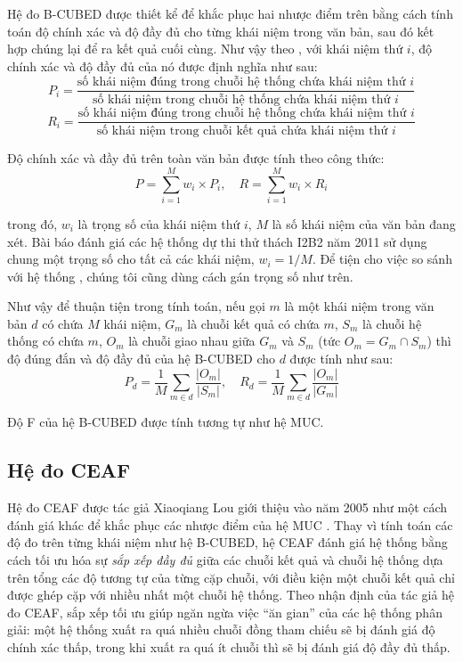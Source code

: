 Hệ đo B-CUBED được thiết kể để khắc phục hai nhược điểm trên bằng cách tính toán độ chính xác và độ đầy đủ cho từng khái niệm trong văn bản, sau đó kết hợp chúng lại để ra kết quả cuối cùng. Như vậy theo \cite{AmitBagga1998}, với khái niệm thứ $i$, độ chính xác và độ đầy đủ của nó được định nghĩa như sau:
\[P_i=\frac{\text{số khái niệm đúng trong chuỗi hệ thống chứa khái niệm thứ $i$}}{\text{số khái niệm trong chuỗi hệ thống chứa khái niệm thứ $i$}}\]
\[R_i=\frac{\text{số khái niệm đúng trong chuỗi hệ thống chứa khái niệm thứ $i$}}{\text{số khái niệm trong chuỗi kết quả chứa khái niệm thứ $i$}}\]

Độ chính xác và đầy đủ trên toàn văn bản được tính theo công thức:
\[P=\sum_{i=1}^{M} w_i \times P_i,\quad R=\sum_{i=1}^{M} w_i\times R_i\]

\noindent trong đó, $w_i$ là trọng số của khái niệm thứ $i$, $M$ là số khái niệm của văn bản đang xét. Bài báo đánh giá các hệ thống dự thi thử thách I2B2 năm 2011 sử dụng chung một trọng số cho tất cả các khái niệm, $w_i=1/M$. Để tiện cho việc so sánh với hệ thống \cite{YanXu2012}, chúng tôi cũng dùng cách gán trọng số như trên.

Như vậy để thuận tiện trong tính toán, nếu gọi $m$ là một khái niệm trong văn bản $d$ có chứa $M$ khái niệm, $G_m$ là chuỗi kết quả có chứa $m$, $S_m$ là chuỗi hệ thống có chứa $m$, $O_m$ là chuỗi giao nhau giữa $G_m$ và $S_m$ (tức $O_m=G_m\cap S_m$) thì độ đúng đắn và độ đầy đủ của hệ B-CUBED cho $d$ được tính như sau:
\[P_d=\frac{1}{M}\sum_{m\in d}\frac{|O_m|}{|S_m|},\quad R_d=\frac{1}{M}\sum_{m\in d}\frac{|O_m|}{|G_m|}\]

Độ F của hệ B-CUBED được tính tương tự như hệ MUC.

\subsection*{Hệ đo CEAF}
Hệ đo CEAF được tác giả Xiaoqiang Lou giới thiệu vào năm 2005 như một cách đánh giá khác để khắc phục các nhược điểm của hệ MUC \cite{XiaoquangLuo2005}. Thay vì tính toán các độ đo trên từng khái niệm như hệ B-CUBED, hệ CEAF đánh giá hệ thống bằng cách tối ưu hóa sự \emph{sắp xếp đầy đủ} giữa các chuỗi kết quả và chuỗi hệ thống dựa trên tổng các độ tương tự của từng cặp chuỗi, với điều kiện một chuỗi kết quả chỉ được ghép cặp với nhiều nhất một chuỗi hệ thống. Theo nhận định của tác giả hệ đo CEAF, sắp xếp tối ưu giúp ngăn ngừa việc ``ăn gian'' của các hệ thống phân giải: một hệ thống xuất ra quá nhiều chuỗi đồng tham chiếu sẽ bị đánh giá độ chính xác thấp, trong khi xuất ra quá ít chuỗi thì sẽ bị đánh giá độ đầy đủ thấp.

